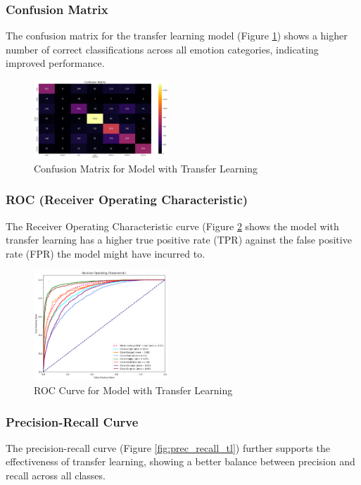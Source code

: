 \documentclass[conference]{IEEEtran}
\begin{document}
\subsubsection{Confusion Matrix}
The confusion matrix for the transfer learning model (Figure \ref{fig:confmat_tl}) shows a higher number of correct classifications across all emotion categories, indicating improved performance.

\begin{figure}[H]
    \centering
    \includegraphics[width=0.45\textwidth]{Figures/Confusion Matrix.png}
    \caption{Confusion Matrix for Model with Transfer Learning}
    \label{fig:confmat_tl}
\end{figure}

\subsubsection{ROC (Receiver Operating Characteristic)}
The Receiver Operating Characteristic curve (Figure \ref{fig:roc_tl} shows the model with transfer learning has a higher true positive rate (TPR) against the false positive rate (FPR) the model might have incurred to.

\begin{figure}[H]
    \centering
    \includegraphics[width=0.45\textwidth]{Figures/ROC.png}
    \caption{ROC Curve for Model with Transfer Learning}
    \label{fig:roc_tl}
\end{figure}
\subsubsection{Precision-Recall Curve}
The precision-recall curve (Figure \ref{fig:prec_recall_tl}) further supports the effectiveness of transfer learning, showing a better balance between precision and recall across all classes.
\end{document}
